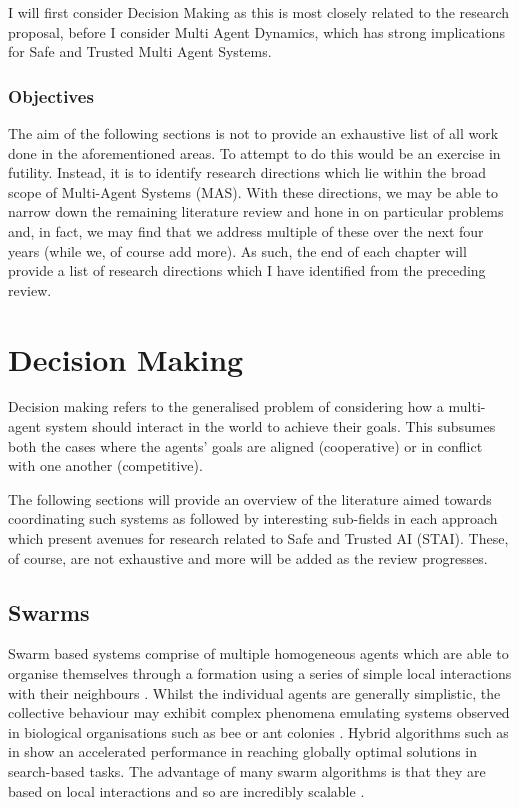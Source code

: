 \documentclass[preprint,11pt]{report}
\begin{document}
I will first consider Decision Making as this is most closely related
to the research proposal, before I consider Multi Agent Dynamics,
which has strong implications for Safe and Trusted Multi Agent
Systems.

\subsection*{Objectives}

The aim of the following sections is not to provide an exhaustive list of all work done in the
aforementioned areas. To attempt to do this would be an exercise in futility. Instead, it is to
identify research directions which lie within the broad scope of Multi-Agent Systems (MAS). With
these directions, we may be able to narrow down the remaining literature review and hone in on
particular problems and, in fact, we may find that we address multiple of these over the next four
years (while we, of course add more). As such, the end of each chapter will provide a list of
research directions which I have identified from the preceding review. 

\chapter{Decision Making}

Decision making refers to the generalised problem of considering how a multi-agent system should
interact in the world to achieve their goals. This subsumes both the cases where the agents' goals
are aligned (cooperative) or in conflict with one another (competitive). 

The following sections will provide an overview of the literature aimed towards coordinating such
systems as followed by interesting sub-fields in each approach which present avenues for research
related to Safe and Trusted AI (STAI). These, of course, are not exhaustive and more will be added
as the review progresses.

\section{Swarms}

Swarm based systems comprise of multiple homogeneous agents which are able to organise themselves
through a formation using a series of simple local interactions with their neighbours
\cite{Couceiro2015}. Whilst the individual agents are generally simplistic, the collective behaviour
may exhibit complex phenomena emulating systems observed in biological organisations such as bee or
ant colonies \cite{Sethi2017}. Hybrid algorithms such as in \cite{Gao2018} show an accelerated
performance in reaching globally optimal solutions in search-based tasks. The advantage of many
swarm algorithms is that they are based on local interactions and so are incredibly scalable
\cite{Rizk2018}. 
\end{document}

